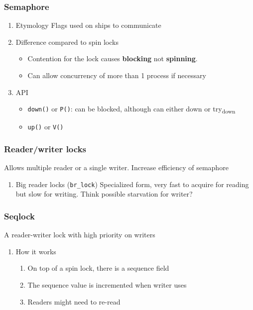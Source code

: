 \documentclass[11pt]{article}
\begin{document}
\subsubsection{Semaphore}
\label{sec:orgfc70ad1}
\begin{enumerate}
\item Etymology
\label{sec:org3a50cae}
Flags used on ships to communicate
\item Difference compared to spin locks
\label{sec:org98d0113}
\begin{itemize}
\item Contention for the lock causes \textbf{blocking} not \textbf{spinning}.
\item Can allow concurrency of more than 1 process if necessary
\end{itemize}
\item API
\label{sec:org01b51c1}
\begin{itemize}
\item \texttt{down()} or \texttt{P()}: can be blocked, although can either down or try\textsubscript{down}
\item \texttt{up()} or \texttt{V()}
\end{itemize}
\end{enumerate}
\subsubsection{Reader/writer locks}
\label{sec:org7e642f2}
Allows multiple reader or a single writer. Increase efficiency of semaphore
\begin{enumerate}
\item Big reader locks (\texttt{br\_lock})
\label{sec:orgab5daa9}
Specialized form, very fast to acquire for reading but slow for writing. Think
possible starvation for writer?
\end{enumerate}
\subsubsection{Seqlock}
\label{sec:orga26343c}
A reader-writer lock with high priority on writers
\begin{enumerate}
\item How it works
\label{sec:orge825d17}
\begin{enumerate}
\item On top of a spin lock, there is a sequence field
\item The sequence value is incremented when writer uses
\item Readers might need to re-read
\end{enumerate}
\end{enumerate}
\end{document}
